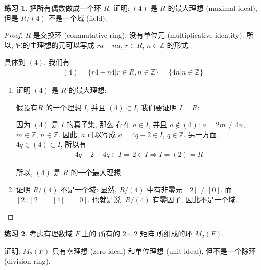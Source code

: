 \documentclass[utf8]{ctexbook}
\theoremstyle{definition}
\newtheorem{exercise}{练习}[section]
\begin{document}
\begin{exercise}
把所有偶数做成一个环 $R$. 证明: $(4)$ 是 $R$ 的最大理想 (maximal ideal), 但是 $R/(4)$ 不是一个域 (field).
\end{exercise}

\begin{proof}
$R$ 是交换环 (commutative ring), 没有单位元 (multiplicative identity). 所以, 它的主理想的元可以写成 $ra + na $, $r \in R$, $n \in \mathbb{Z}$ 的形式. 

具体到 $(4)$, 我们有
\begin{align*}
(4) = \{ r 4 + n 4 | r \in R, n \in \mathbb{Z} \} = \{ 4 n | n \in \mathbb{Z} \} 
\end{align*}
\begin{enumerate}
\item{证明 $(4)$ 是 $R$ 的最大理想:

假设有$R$ 的一个理想 $I$, 并且 $(4) \subset I$, 我们要证明 $I =R$:

因为 $(4)$ 是 $I$ 的真子集, 那么 存在 $a \in I$, 并且 $a \not \in (4)$: $a = 2m  \neq 4n $, $m \in \mathbb{Z}$, $n \in \mathbb{Z}$. 因此, $a$ 可以写成 $a = 4q + 2 \in I$, $q \in \mathbb{Z}$. 另一方面, $4q \in (4) \subset I $, 所以有
\begin{align*}
4q+2 - 4q \in I \Longrightarrow 2 \in I \Longrightarrow I = (2) = R
\end{align*}

所以, $(4)$ 是 $R$ 的一个最大理想.}
\item{证明 $R/(4)$ 不是一个域: 显然, $R/(4)$ 中有非零元 $[2] \neq [0]$. 而 $[2][2] = [4] = [0]$. 也就是说, $R/(4)$ 有零因子, 因此不是一个域.
}
\end{enumerate}
\end{proof}


\begin{exercise}\label{exercise_simple_ring_not_division_ring}
考虑有理数域 $F$ 上的 所有的 $2 \times 2$ 矩阵 所组成的环 $M_{2} (F)$.

证明: $M_{2} (F)$ 只有零理想 (zero ideal) 和单位理想 (unit ideal), 但不是一个除环 (division ring).
\end{exercise}
\end{document}

